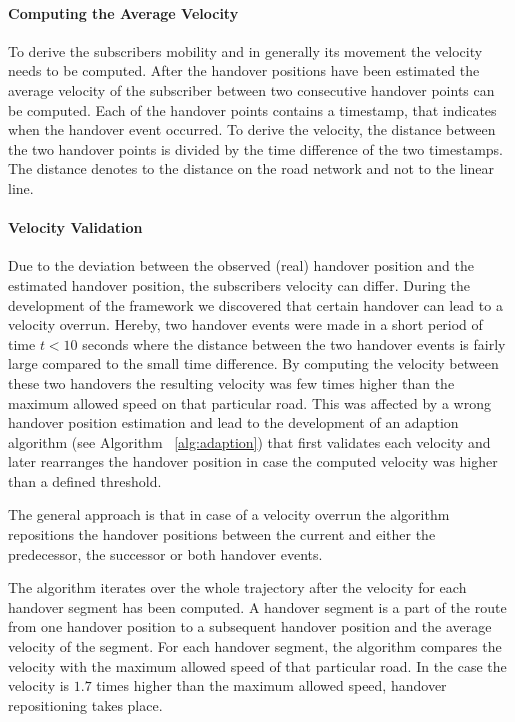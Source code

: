 \documentclass[twocolumn]{bmcart}%
\begin{document}
\paragraph{Computing the Average Velocity}
To derive the subscribers mobility and in generally its movement the velocity needs to be computed. 
After the handover positions have been estimated the average velocity of the subscriber between two consecutive handover points can be computed. 
Each of the handover points contains a timestamp, that indicates when the handover event occurred. To derive the velocity, the distance between the two handover points is divided by the time difference of the two timestamps. The distance denotes to the distance on the road network and not to the linear line. 

\paragraph{Velocity Validation}
Due to the deviation between the observed (real) handover position and the estimated handover position, the subscribers velocity can differ. During the development of the framework we discovered that certain handover can lead to a velocity overrun. Hereby, two handover events were made in a short period of time $t<10$ seconds where the distance between the two handover events is fairly large compared to the small time difference. By computing the velocity between these two handovers the resulting velocity was few times higher than the maximum allowed speed on that particular road. This was affected by a wrong handover position estimation and lead to the development of an adaption algorithm (see Algorithm ~\ref{alg:adaption}) that first validates each velocity and later rearranges the handover position in case the computed velocity was higher than a defined threshold. 

The general approach is that in case of a velocity overrun the algorithm repositions the handover positions between the current and either the predecessor, the successor or both handover events.

The algorithm iterates over the whole trajectory after the velocity for each handover segment has been computed. A handover segment is a part of the route from one handover position to a subsequent handover position and the average velocity of the segment. For each handover segment, the algorithm compares the velocity with the maximum allowed speed of that particular road. In the case the velocity is $1.7$ times higher than the maximum allowed speed, handover repositioning takes place. 
\end{document}
